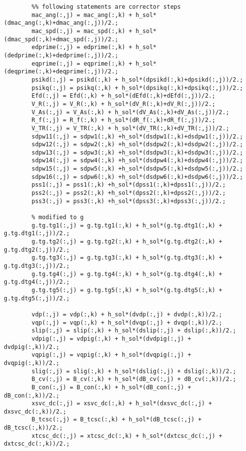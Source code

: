 \documentclass[12pt]{article}
\begin{document}
\begin{verbatim}
        %% following statements are corrector steps
        mac_ang(:,j) = mac_ang(:,k) + h_sol*(dmac_ang(:,k)+dmac_ang(:,j))/2.;
        mac_spd(:,j) = mac_spd(:,k) + h_sol*(dmac_spd(:,k)+dmac_spd(:,j))/2.;
        edprime(:,j) = edprime(:,k) + h_sol*(dedprime(:,k)+dedprime(:,j))/2.;
        eqprime(:,j) = eqprime(:,k) + h_sol*(deqprime(:,k)+deqprime(:,j))/2.;
        psikd(:,j) = psikd(:,k) + h_sol*(dpsikd(:,k)+dpsikd(:,j))/2.;
        psikq(:,j) = psikq(:,k) + h_sol*(dpsikq(:,k)+dpsikq(:,j))/2.;
        Efd(:,j) = Efd(:,k) + h_sol*(dEfd(:,k)+dEfd(:,j))/2.;
        V_R(:,j) = V_R(:,k) + h_sol*(dV_R(:,k)+dV_R(:,j))/2.;
        V_As(:,j) = V_As(:,k) + h_sol*(dV_As(:,k)+dV_As(:,j))/2.;
        R_f(:,j) = R_f(:,k) + h_sol*(dR_f(:,k)+dR_f(:,j))/2.;
        V_TR(:,j) = V_TR(:,k) + h_sol*(dV_TR(:,k)+dV_TR(:,j))/2.;
        sdpw11(:,j) = sdpw1(:,k) +h_sol*(dsdpw1(:,k)+dsdpw1(:,j))/2.;
        sdpw12(:,j) = sdpw2(:,k) +h_sol*(dsdpw2(:,k)+dsdpw2(:,j))/2.;
        sdpw13(:,j) = sdpw3(:,k) +h_sol*(dsdpw3(:,k)+dsdpw3(:,j))/2.;
        sdpw14(:,j) = sdpw4(:,k) +h_sol*(dsdpw4(:,k)+dsdpw4(:,j))/2.;
        sdpw15(:,j) = sdpw5(:,k) +h_sol*(dsdpw5(:,k)+dsdpw5(:,j))/2.;
        sdpw16(:,j) = sdpw6(:,k) +h_sol*(dsdpw6(:,k)+dsdpw6(:,j))/2.;
        pss1(:,j) = pss1(:,k) +h_sol*(dpss1(:,k)+dpss1(:,j))/2.;
        pss2(:,j) = pss2(:,k) +h_sol*(dpss2(:,k)+dpss2(:,j))/2.;
        pss3(:,j) = pss3(:,k) +h_sol*(dpss3(:,k)+dpss3(:,j))/2.;
        
        % modified to g
        g.tg.tg1(:,j) = g.tg.tg1(:,k) + h_sol*(g.tg.dtg1(:,k) + g.tg.dtg1(:,j))/2.;
        g.tg.tg2(:,j) = g.tg.tg2(:,k) + h_sol*(g.tg.dtg2(:,k) + g.tg.dtg2(:,j))/2.;
        g.tg.tg3(:,j) = g.tg.tg3(:,k) + h_sol*(g.tg.dtg3(:,k) + g.tg.dtg3(:,j))/2.;
        g.tg.tg4(:,j) = g.tg.tg4(:,k) + h_sol*(g.tg.dtg4(:,k) + g.tg.dtg4(:,j))/2.;
        g.tg.tg5(:,j) = g.tg.tg5(:,k) + h_sol*(g.tg.dtg5(:,k) + g.tg.dtg5(:,j))/2.;
        
        vdp(:,j) = vdp(:,k) + h_sol*(dvdp(:,j) + dvdp(:,k))/2.;
        vqp(:,j) = vqp(:,k) + h_sol*(dvqp(:,j) + dvqp(:,k))/2.;
        slip(:,j) = slip(:,k) + h_sol*(dslip(:,j) + dslip(:,k))/2.;
        vdpig(:,j) = vdpig(:,k) + h_sol*(dvdpig(:,j) + dvdpig(:,k))/2.;
        vqpig(:,j) = vqpig(:,k) + h_sol*(dvqpig(:,j) + dvqpig(:,k))/2.;
        slig(:,j) = slig(:,k) + h_sol*(dslig(:,j) + dslig(:,k))/2.;
        B_cv(:,j) = B_cv(:,k) + h_sol*(dB_cv(:,j) + dB_cv(:,k))/2.;
        B_con(:,j) = B_con(:,k) + h_sol*(dB_con(:,j) + dB_con(:,k))/2.;
        xsvc_dc(:,j) = xsvc_dc(:,k) + h_sol*(dxsvc_dc(:,j) + dxsvc_dc(:,k))/2.;
        B_tcsc(:,j) = B_tcsc(:,k) + h_sol*(dB_tcsc(:,j) + dB_tcsc(:,k))/2.;
        xtcsc_dc(:,j) = xtcsc_dc(:,k) + h_sol*(dxtcsc_dc(:,j) + dxtcsc_dc(:,k))/2.;  
        

\end{verbatim}
\end{document}
